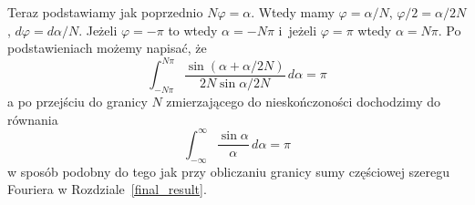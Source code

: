 Teraz podstawiamy jak poprzednio
$N\varphi=\alpha$\@. 
Wtedy mamy $\varphi=\alpha/N$, $\varphi/2=\alpha/2N$, $d\varphi=d\alpha/N$\@.
Jeżeli $\varphi=-\pi$ to wtedy $\alpha=-N\pi$ i~jeżeli $\varphi=\pi$ wtedy $\alpha=N\pi$\@.
Po podstawieniach możemy napisać, że
\begin{equation}
\int_{-N\pi}^{N\pi} \frac{\sin(\alpha+\alpha/2N)}{2N \sin \alpha/2N} \, d\alpha  
= \pi
\end{equation}
a po przejściu do granicy $N$ zmierzającego do nieskończoności dochodzimy do równania
\begin{equation}
\int_{-\infty}^{\infty} \frac{\sin \alpha}{\alpha} \, d\alpha = \pi
\end{equation}
w sposób podobny do tego jak przy obliczaniu granicy sumy częściowej szeregu Fouriera w Rozdziale~\ref{final_result}\@.


